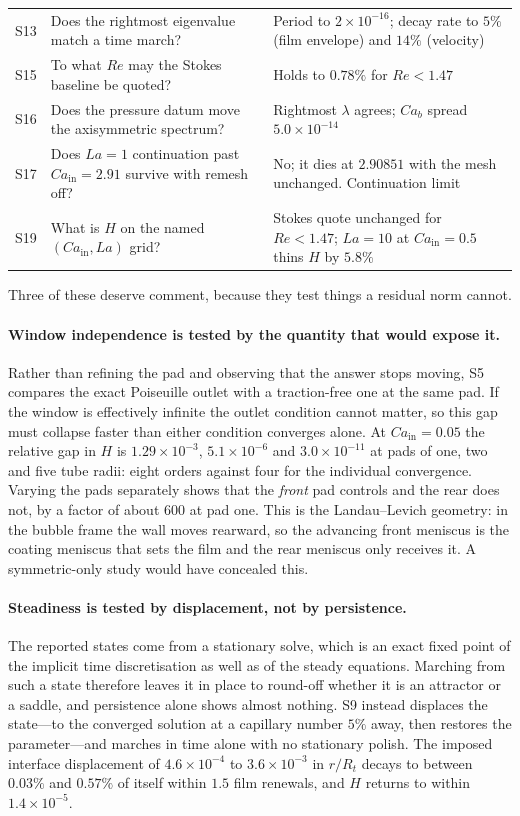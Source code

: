 \documentclass[11pt,a4paper]{article}
\begin{document}
\begin{table}[t]
\begin{tabular}{@{}lp{50mm}p{72mm}@{}}
    S13 & Does the rightmost eigenvalue match a time march? & Period to $2\times10^{-16}$; decay rate to $5\%$ (film envelope) and $14\%$ (velocity) \\
    S15 & To what $Re$ may the Stokes baseline be quoted? & Holds to $0.78\%$ for $Re<1.47$ \\
    S16 & Does the pressure datum move the axisymmetric spectrum? & Rightmost $\lambda$ agrees; $Ca_b$ spread $5.0\times10^{-14}$ \\
    S17 & Does $La=1$ continuation past $Ca_{\mathrm{in}}=2.91$ survive with remesh off? & No; it dies at $2.90851$ with the mesh unchanged. Continuation limit \\
    S19 & What is $H$ on the named $(Ca_{\mathrm{in}},La)$ grid? & Stokes quote unchanged for $Re<1.47$; $La=10$ at $Ca_{\mathrm{in}}=0.5$ thins $H$ by $5.8\%$ \\
    \bottomrule
  \end{tabular}
\end{table}

Three of these deserve comment, because they test things a residual norm cannot.

\paragraph{Window independence is tested by the quantity that would expose it.}
Rather than refining the pad and observing that the answer stops moving, S5
compares the exact Poiseuille outlet with a traction-free one at the same pad.
If the window is effectively infinite the outlet condition cannot matter, so
this gap must collapse faster than either condition converges alone. At
$Ca_{\mathrm{in}}=0.05$ the relative gap in $H$ is $1.29\times10^{-3}$,
$5.1\times10^{-6}$ and $3.0\times10^{-11}$ at pads of one, two and five tube
radii: eight orders against four for the individual convergence. Varying the
pads separately shows that the \emph{front} pad controls and the rear does not,
by a factor of about $600$ at pad one. This is the Landau--Levich geometry: in
the bubble frame the wall moves rearward, so the advancing front meniscus is
the coating meniscus that sets the film and the rear meniscus only receives it.
A symmetric-only study would have concealed this.

\paragraph{Steadiness is tested by displacement, not by persistence.} The
reported states come from a stationary solve, which is an exact fixed point of
the implicit time discretisation as well as of the steady equations. Marching
from such a state therefore leaves it in place to round-off whether it is an
attractor or a saddle, and persistence alone shows almost nothing. S9 instead
displaces the state---to the converged solution at a capillary number $5\%$
away, then restores the parameter---and marches in time alone with no
stationary polish. The imposed interface displacement of $4.6\times10^{-4}$ to
$3.6\times10^{-3}$ in $r/R_t$ decays to between $0.03\%$ and $0.57\%$ of itself
within $1.5$ film renewals, and $H$ returns to within $1.4\times10^{-5}$.
\end{document}
